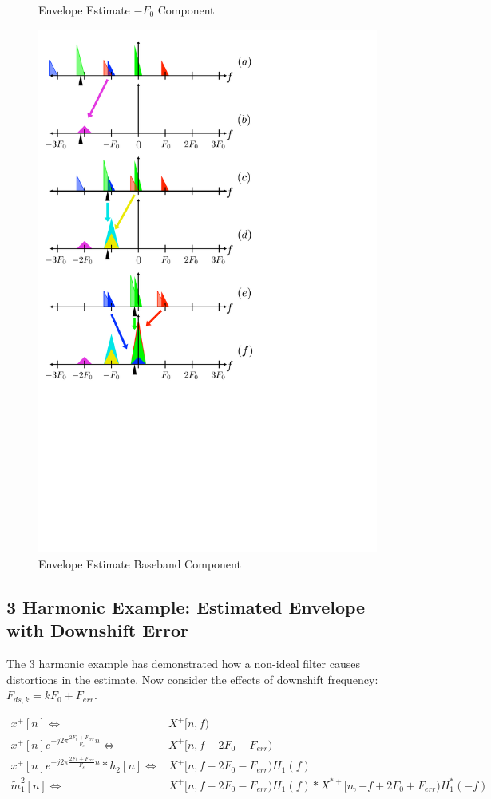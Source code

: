 \documentclass [11pt, proquest,oneside] {ganter_thesis}[2015/03/03]
\begin{document}
\begin{figure}[!ht]
    \caption{Envelope Estimate $-F_0$ Component}\label{fig:harmonic_envelope_F0}
    \includegraphics[width=.62\textwidth]{harmonic_envelope_0}
    \caption{Envelope Estimate Baseband Component}\label{fig:harmonic_envelope_0}
\end{figure}

\clearpage

\subsection{3 Harmonic Example: Estimated Envelope with Downshift Error}

The 3 harmonic example has demonstrated how a non-ideal filter causes distortions in the estimate.  Now consider the effects of downshift frequency: $F_{ds,k} = kF_0 + F_{err}$.

\begin{align}
\label{eq:harmonic_estimate_ERR_fig_a}
x^+[n] \Longleftrightarrow& X^+[n,f) \\
%
x^+[n]e^{-j2\pi \frac{2F_0 + F_{err}}{F_s}n} \Longleftrightarrow& X^+[n,f - 2F_0 - F_{err}) \\
%
\label{eq:harmonic_estimate_ERR_fig_c}
x^+[n]e^{-j2\pi \frac{2F_0 + F_{err}}{F_s}n} * h_2[n] \Longleftrightarrow& X^+[n,f - 2F_0 - F_{err}) H_1(f) \\
%
\label{eq:harmonic_estimate_ERR_fig_e}
\tilde{m}_1^2[n] \Longleftrightarrow& X^+[n,f - 2F_0 - F_{err}) H_1(f) * X^{*+}[n,-f + 2F_0 + F_{err}) H_1^*(-f)
\end{align}
\end{document}
